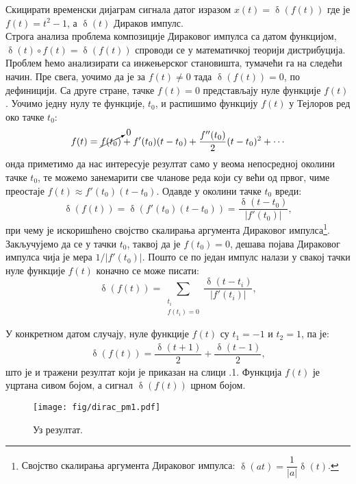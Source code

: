 \noindent
\PID 
Скицирати временски дијаграм сигнала датог изразом $x(t) = \updelta(f(t))$ где је 
$f(t) = t^2 - 1$, а
$\updelta(t)$ Дираков импулс. \\[2mm]

\RESENJE  
Строга анализа проблема композиције Дираковог импулса са датом функцијом, $\updelta(t) \circ f(t) = \updelta(f(t))$ 
спроводи се у математичкој теорији дистрибуција. Проблем ћемо анализирати са инжењерског становишта, 
тумачећи га на следећи начин. Пре свега, уочимо да је за $f(t) \neq 0$ тада $\updelta(f(t)) = 0$, по дефиницији.    
Са друге стране, тачке $f(t) = 0$ представљају нуле функције $f(t)$. Уочимо једну нулу те функције, $t_0$, и распишимо
функцију $f(t)$ у Тејлоров ред око тачке $t_0$:
\begin{eqnarray}
    f(t) = \cancelto{0}{f(t_0)} + f'(t_0) (t-t_0) + \dfrac{f''(t_0)}{2} (t-t_0)^2 + \cdots
\end{eqnarray}
онда приметимо да нас интересује резултат само у веома непосредној околини тачке $t_0$, те можемо занемарити све
чланове реда који су већи од првог, чиме преостаје $f(t) \approx f'(t_0) (t-t_0)$. Одавде у околини тачке 
$t_0$ вреди: 
\begin{equation}
    \updelta(f(t)) = \updelta(f'(t_0) (t-t_0)) = \dfrac{\updelta(t-t_0)}{|f'(t_0)|},
\end{equation}
при чему је искоришћено својство скалирања аргумента Дираковог импулса\footnote{Својство скалирања аргумента Дираковог импулса:
$\updelta(at) = \dfrac{1}{|a|} \updelta(t)$.}.
Закључујемо да се у тачки $t_0$, таквој да је $f(t_0) = 0$, дешава појава Дираковог импулса чија је мера $1/|f'(t_0)|$.
Пошто се по један импулс налази у свакој тачки нуле функције $f(t)$ коначно се може писати:
\begin{equation}
    \updelta(f(t)) = \sum_{\substack{t_i \\[0.5mm] f(t_i)=0}} \dfrac{\updelta(t-t_i)}{|f'(t_i)|},
\end{equation}

\noindent
У конкретном датом случају, нуле функције $f(t)$ су ${t_1 = -1}$ и {$t_2 = 1$}, па је:
\begin{eqnarray}
    \updelta(f(t)) = \dfrac{\updelta(t+1)}{2} + \dfrac{\updelta(t-1)}{2},
\end{eqnarray}
што је и тражени резултат који је приказан на слици \ID.1.
Функција $f(t)$ је уцртана сивом бојом, а сигнал $\updelta(f(t))$ црном бојом.

\begin{figure}[ht!]
    \centering
    \texttt{[image: fig/dirac\_pm1.pdf]}
    \caption{Уз резултат. }
\end{figure}